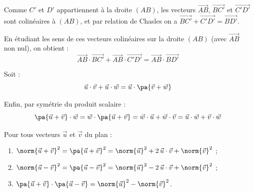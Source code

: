 \begin{demonstration}
\begin{itemize}
		      Comme $C'$ et $D'$ appartiennent à la droite $(AB)$, les vecteurs $\vec{AB}$, $\vec{BC'}$ et $\vec{C'D'}$ sont colinéaires à $(AB)$, et par relation de Chasles on a $\vec{BC'} + \vec{C'D'} = \vec{BD'}$.

		      En étudiant les sens de ces vecteurs colinéaires sur la droite $(AB)$ (avec $\vec{AB}$ non nul), on obtient :
		      \[
			      \vec{AB} \cdot \vec{BC'} + \vec{AB} \cdot \vec{C'D'} = \vec{AB} \cdot \vec{BD'}
		      \]

		      Soit :
		      \[
			      \vec{u} \cdot \vec{v} + \vec{u} \cdot \vec{w} = \vec{u} \cdot \pa{\vec{v} + \vec{w}}
		      \]

		      Enfin, par symétrie du produit scalaire :
		      \[
			      \pa{\vec{u} + \vec{v}} \cdot \vec{w} = \vec{w} \cdot \pa{\vec{u} + \vec{v}} = \vec{w} \cdot \vec{u} + \vec{w} \cdot \vec{v} = \vec{u} \cdot \vec{w} + \vec{v} \cdot \vec{w}
		      \]
	\end{itemize}
\end{demonstration}

\begin{propriete}
	Pour tous vecteurs $\vec{u}$ et $\vec{v}$ du plan :
	\begin{enumerate}
		\item $\norm{\vec{u} + \vec{v}}^2 = \pa{\vec{u} + \vec{v}}^2 = \norm{\vec{u}}^2 + 2\,\vec{u} \cdot \vec{v} + \norm{\vec{v}}^2$ ;
		\item $\norm{\vec{u} - \vec{v}}^2 = \pa{\vec{u} - \vec{v}}^2 = \norm{\vec{u}}^2 - 2\,\vec{u} \cdot \vec{v} + \norm{\vec{v}}^2$ ;
		\item $\pa{\vec{u} + \vec{v}} \cdot \pa{\vec{u} - \vec{v}} = \norm{\vec{u}}^2 - \norm{\vec{v}}^2$.
	\end{enumerate}
\end{propriete}

